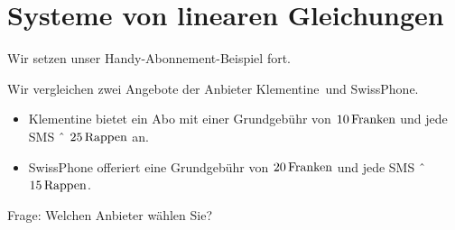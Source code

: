 \documentclass[%
11pt,%
twoside,%
titlepage,%
german,%
headsepline%
]{scrartcl}
\begin{document}
\section{Systeme von linearen Gleichungen}
Wir setzen unser Handy-Abonnement-Beispiel fort.
\begin{bsp}
Wir vergleichen zwei Angebote der Anbieter \glqq Klementine\grqq\ und \glqq SwissPhone\grqq.
\begin{itemize}
\item Klementine bietet ein Abo mit einer Grundgeb\"uhr von $\unit[10]{Franken}$ und jede SMS ˆ $\unit[25]{Rappen}$ an.
\item SwissPhone offeriert eine Grundgeb\"uhr von $\unit[20]{Franken}$ und jede SMS ˆ $\unit[15]{Rappen}$.
\end{itemize}
Frage: Welchen Anbieter w\"ahlen Sie?\\[0ex]


\end{bsp}
\end{document}
